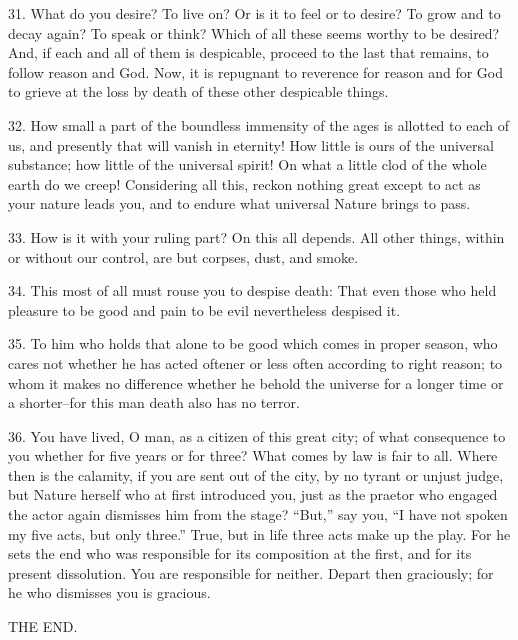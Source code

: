 \documentclass{book}
\begin{document}
31. What do you desire? To live on? Or is it to feel or to desire? To
grow and to decay again? To speak or think? Which of all these seems
worthy to be desired? And, if each and all of them is despicable,
proceed to the last that remains, to follow reason and God. Now, it is
repugnant to reverence for reason and for God to grieve at the loss by
death of these other despicable things.

32. How small a part of the boundless immensity of the ages is
allotted to each of us, and presently that will vanish in eternity!
How little is ours of the universal substance; how little of the
universal spirit!  On what a little clod of the whole earth do we
creep! Considering all this, reckon nothing great except to act as
your nature leads you, and to endure what universal Nature brings to
pass.

33. How is it with your ruling part? On this all depends. All other
things, within or without our control, are but corpses, dust, and
smoke.

34. This most of all must rouse you to despise death: That even those
who held pleasure to be good and pain to be evil nevertheless despised
it.

35. To him who holds that alone to be good which comes in proper
season, who cares not whether he has acted oftener or less often
according to right reason; to whom it makes no difference whether he
behold the universe for a longer time or a shorter--for this man
death also has no terror.

36. You have lived, O man, as a citizen of this great city; of what
consequence to you whether for five years or for three? What comes by
law is fair to all. Where then is the calamity, if you are sent out of
the city, by no tyrant or unjust judge, but Nature herself who at
first introduced you, just as the praetor who engaged the actor again
dismisses him from the stage? ``But,'' say you, ``I have not spoken my
five acts, but only three.'' True, but in life three acts make up the
play. For he sets the end who was responsible for its composition at
the first, and for its present dissolution. You are responsible for
neither. Depart then graciously; for he who dismisses you is gracious.

\begin{center}THE END.\end{center}

\backmatter
\end{document}
